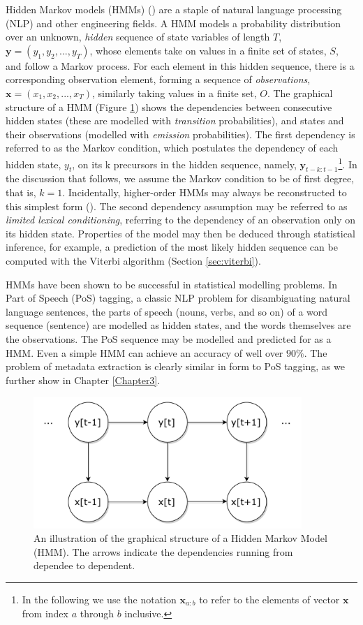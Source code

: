 Hidden Markov models (HMMs) (\cite{rabiner1989tutorial}) are a staple of natural language processing (NLP) and other engineering fields. A HMM models a probability distribution over an unknown, \emph{hidden} sequence of state variables of length $T$, $\mathbf{y} = (y_1, y_2, ..., y_T)$, whose elements take on values in a finite set of states, $S$, and follow a Markov process. For each element in this hidden sequence, there is a corresponding observation element, forming a sequence of \emph{observations}, $\mathbf{x} = (x_1, x_2, ..., x_T)$, similarly taking values in a finite set, $O$. The graphical structure of a HMM (Figure \ref{fig:HMM}) shows the dependencies between consecutive hidden states (these are modelled with \emph{transition} probabilities), and states and their observations (modelled with \emph{emission} probabilities). The first dependency is referred to as the Markov condition, which postulates the dependency of each hidden state, $y_t$, on its k precursors in the hidden sequence, namely, $\mathbf{y}_{t-k:t-1}$\footnote{In the following we use the notation $\mathbf{x}_{a:b}$ to refer to the elements of vector $\mathbf{x}$ from index $a$ through $b$ inclusive.}. In the discussion that follows, we assume the Markov condition to be of first degree, that is, $k =1$. Incidentally, higher-order HMMs may always be reconstructed to this simplest form (\cite{reference}). The second dependency assumption may be referred to as \emph{limited lexical conditioning}, referring to the dependency of an observation only on its hidden state. Properties of the model may then be deduced through statistical inference, for example, a prediction of the most likely hidden sequence can be computed with the Viterbi algorithm (Section \ref{sec:viterbi}).

HMMs have been shown to be successful in statistical modelling problems. In Part of Speech (PoS) tagging, a classic NLP problem for disambiguating natural language sentences, the parts of speech (nouns, verbs, and so on) of a word sequence (sentence) are modelled as hidden states, and the words themselves are the observations. The PoS sequence may be modelled and predicted for as a HMM. Even a simple HMM can achieve an accuracy of well over $90\%$. The problem of metadata extraction is clearly similar in form to PoS tagging, as we further show in Chapter \ref{Chapter3}.

\begin{figure}[t]
\center
\includegraphics[width=4in]{Figures/HMM.pdf}
\caption{An illustration of the graphical structure of a Hidden Markov Model (HMM). The arrows indicate the dependencies running from dependee to dependent.}
\label{fig:HMM}
\end{figure}


